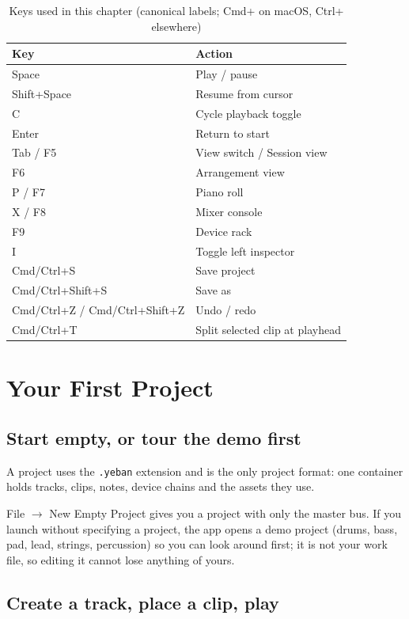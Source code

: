 \begin{table}[htbp]
\centering
\caption{Keys used in this chapter (canonical labels; Cmd+ on macOS, Ctrl+ elsewhere)}
\label{tab:ch01-keys}
\begin{tabular}{ll}
\hline
Key & Action \\
\hline
Space & Play / pause \\
Shift+Space & Resume from cursor \\
C & Cycle playback toggle \\
Enter & Return to start \\
Tab / F5 & View switch / Session view \\
F6 & Arrangement view \\
P / F7 & Piano roll \\
X / F8 & Mixer console \\
F9 & Device rack \\
I & Toggle left inspector \\
Cmd/Ctrl+S & Save project \\
Cmd/Ctrl+Shift+S & Save as \\
Cmd/Ctrl+Z / Cmd/Ctrl+Shift+Z & Undo / redo \\
Cmd/Ctrl+T & Split selected clip at playhead \\
\hline
\end{tabular}
\end{table}

\section{Your First Project}

\subsection{Start empty, or tour the demo first}

A project uses the \texttt{.yeban} extension and is the only project format: one
container holds tracks, clips, notes, device chains and the assets they use.

File $\to$ New Empty Project gives you a project with only the master bus. If you
launch without specifying a project, the app opens a demo project (drums, bass, pad,
lead, strings, percussion) so you can look around first; it is not your work file, so
editing it cannot lose anything of yours.

\subsection{Create a track, place a clip, play}

